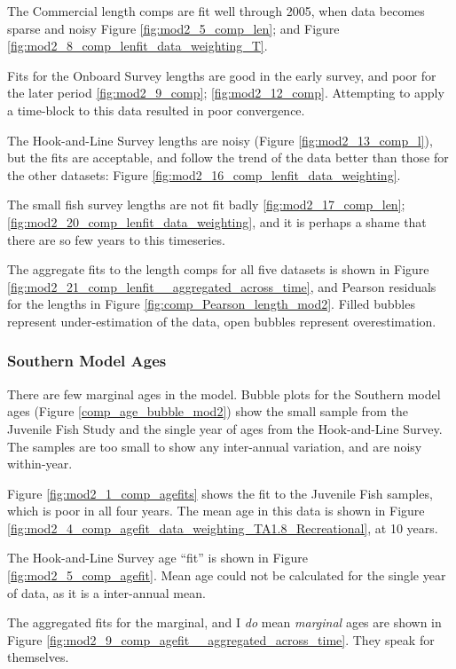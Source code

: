 \documentclass[12pt,]{article}
\begin{document}
The Commercial length comps are fit well through 2005, when data becomes
sparse and noisy Figure \ref{fig:mod2_5_comp_len}; and Figure
\ref{fig:mod2_8_comp_lenfit_data_weighting_T}.

Fits for the Onboard Survey lengths are good in the early survey, and
poor for the later period \ref{fig:mod2_9_comp}; \ref{fig:mod2_12_comp}.
Attempting to apply a time-block to this data resulted in poor
convergence.

The Hook-and-Line Survey lengths are noisy (Figure
\ref{fig:mod2_13_comp_l}), but the fits are acceptable, and follow the
trend of the data better than those for the other datasets: Figure
\ref{fig:mod2_16_comp_lenfit_data_weighting}.

The small fish survey lengths are not fit badly
\ref{fig:mod2_17_comp_len};
\ref{fig:mod2_20_comp_lenfit_data_weighting}, and it is perhaps a shame
that there are so few years to this timeseries.

The aggregate fits to the length comps for all five datasets is shown in
Figure \ref{fig:mod2_21_comp_lenfit__aggregated_across_time}, and
Pearson residuals for the lengths in Figure
\ref{fig:comp_Pearson_length_mod2}. Filled bubbles represent
under-estimation of the data, open bubbles represent overestimation.

\subsubsection{Southern Model Ages}\label{southern-model-ages}

There are few marginal ages in the model. Bubble plots for the Southern
model ages (Figure \ref{comp_age_bubble_mod2}) show the small sample
from the Juvenile Fish Study and the single year of ages from the
Hook-and-Line Survey. The samples are too small to show any inter-annual
variation, and are noisy within-year.

Figure \ref{fig:mod2_1_comp_agefits} shows the fit to the Juvenile Fish
samples, which is poor in all four years. The mean age in this data is
shown in Figure
\ref{fig:mod2_4_comp_agefit_data_weighting_TA1.8_Recreational}, at 10
years.

The Hook-and-Line Survey age ``fit'' is shown in Figure
\ref{fig:mod2_5_comp_agefit}. Mean age could not be calculated for the
single year of data, as it is a inter-annual mean.

The aggregated fits for the marginal, and I \emph{do} mean
\emph{marginal} ages are shown in Figure
\ref{fig:mod2_9_comp_agefit__aggregated_across_time}. They speak for
themselves.
\end{document}
